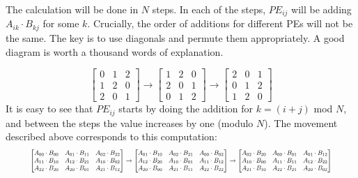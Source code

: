 \documentclass[12pt,a4paper,oneside,openright]{report}
\begin{document}
The calculation will be done in $N$ steps. In each of the steps, $PE_{ij}$ will be adding $A_{ik}\cdot B_{kj}$ for some $k$. Crucially, the order of additions for different PEs will not be the same. The key is to use diagonals and permute them appropriately. A good diagram is worth a thousand words of explanation. 

\begin{equation}
\begin{bmatrix}
0 & 1 & 2 \\
1 & 2 & 0\\
2 & 0 & 1 
\end{bmatrix}
\rightarrow
\begin{bmatrix}
1 & 2 & 0 \\
2 & 0 & 1\\
0 & 1 & 2
\end{bmatrix}
\rightarrow
\begin{bmatrix}
2 & 0 & 1 \\
0 & 1 & 2 \\
1 & 2 & 0
\end{bmatrix}
\end{equation}
It is easy to see that $PE_{ij}$ starts by doing the addition for $k=(i+j)$ mod $N$, and between the steps the value increases by one (modulo $N$). The movement described above corresponds to this computation: 
\begin{equation}
\resizebox{0.9\hsize}{!}{$
\begin{bmatrix}
A_{00} \cdot B_{00} & A_{01} \cdot B_{11} & A_{02} \cdot B_{22} \\
A_{11} \cdot B_{10} & A_{12} \cdot B_{21} & A_{10} \cdot B_{02} \\
A_{22} \cdot B_{20} & A_{20} \cdot B_{01} & A_{21} \cdot B_{12} 
\end{bmatrix}
\rightarrow
\begin{bmatrix}
A_{01} \cdot B_{10} & A_{02} \cdot B_{21} & A_{00} \cdot B_{02} \\
A_{12} \cdot B_{20} & A_{10} \cdot B_{01} & A_{11} \cdot B_{12} \\
A_{20} \cdot B_{00} & A_{21} \cdot B_{11} & A_{22} \cdot B_{22} 
\end{bmatrix}
\rightarrow
\begin{bmatrix}
A_{02} \cdot B_{20} & A_{00} \cdot B_{01} & A_{01} \cdot B_{12} \\
A_{10} \cdot B_{00} & A_{11} \cdot B_{11} & A_{12} \cdot B_{22} \\
A_{21} \cdot B_{10} & A_{22} \cdot B_{21} & A_{20} \cdot B_{02} 
\end{bmatrix}
$}
\end{equation}
\end{document}
